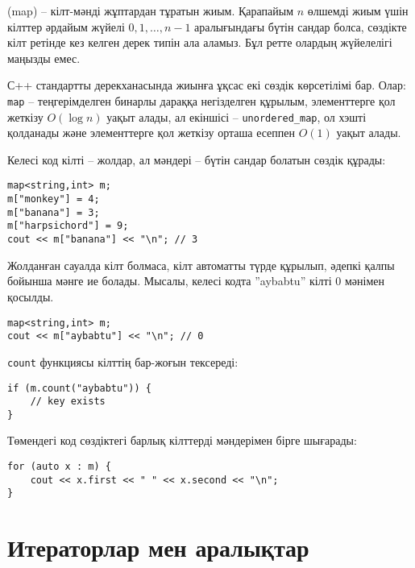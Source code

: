 
 (map) -- кілт-мәнді жұптардан тұратын жиым.
Қарапайым $n$ өлшемді жиым үшін кілттер 
әрдайым жүйелі $0,1,\ldots,n-1$ 
аралығындағы бүтін сандар болса, сөздікте кілт
ретінде кез келген дерек типін ала аламыз. Бұл ретте олардың жүйелелігі маңызды емес.

С++ стандартты дерекханасында жиынға ұқсас екі сөздік көрсетілімі бар. Олар:
\texttt{map} -- теңгерімделген бинарлы дараққа негізделген құрылым,
элементтерге қол жеткізу $O(\log n)$ уақыт алады, ал екіншісі -- \texttt{unordered\_map}, ол
хэшті қолданады және элементтерге қол жеткізу орташа есеппен $O(1)$ уақыт алады.

Келесі код кілті -- жолдар, ал мәндері -- бүтін сандар болатын
сөздік құрады:

\begin{lstlisting}
map<string,int> m;
m["monkey"] = 4;
m["banana"] = 3;
m["harpsichord"] = 9;
cout << m["banana"] << "\n"; // 3
\end{lstlisting}

Жолданған сауалда кілт болмаса, кілт автоматты түрде құрылып,
әдепкі қалпы бойынша мәнге ие болады. %
Мысалы, келесі кодта ''aybabtu'' кілті 0 мәнімен қосылды.

\begin{lstlisting}
map<string,int> m;
cout << m["aybabtu"] << "\n"; // 0
\end{lstlisting}
\texttt{count} функциясы кілттің бар-жоғын тексереді:
\begin{lstlisting}
if (m.count("aybabtu")) {
    // key exists
}
\end{lstlisting}
Төмендегі код сөздіктегі барлық кілттерді мәндерімен бірге шығарады:
\begin{lstlisting}
for (auto x : m) {
    cout << x.first << " " << x.second << "\n";
}
\end{lstlisting}

\section{Итераторлар мен аралықтар}

